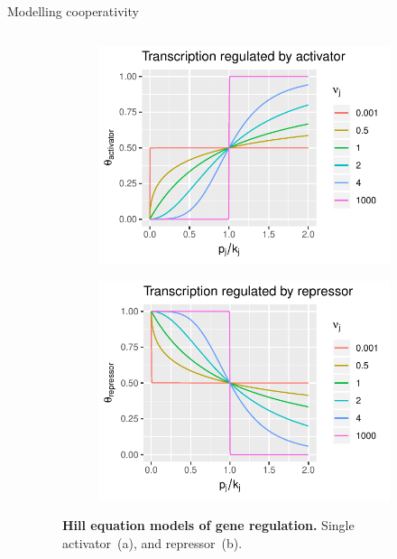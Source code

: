 \begin{frame}{Modelling cooperativity}
\begin{columns}
\begin{column}{0.4\textwidth}
\end{column}
\begin{column}{0.6\textwidth}
\begin{figure}[ht]
\centering
\begin{subfigure}[b]{0.49\textwidth}\centering\caption{}
\includegraphics[width=\textwidth]{theory/fig/hill_activator.pdf}
\end{subfigure}
\begin{subfigure}[b]{0.49\textwidth}\centering\caption{}
\includegraphics[width=\textwidth]{theory/fig/hill_repressor.pdf}
\end{subfigure}
\caption{\textbf{Hill equation models of gene regulation.} Single activator~(a), and repressor~(b).
}
\end{figure}
\end{column}
\end{columns}
\end{frame}
